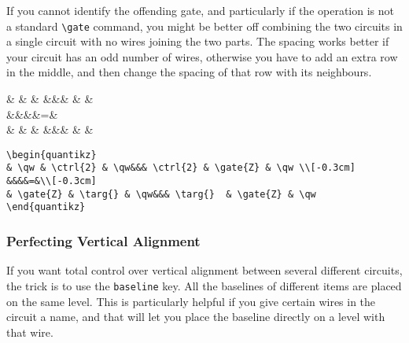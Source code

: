 \documentclass[aps,pra,10pt,nofootinbib]{revtex4}
\begin{document}
If you cannot identify the offending gate, and particularly if the operation is not a standard \verb!\gate! command, you might be better off combining the two circuits in a single circuit with no wires joining the two parts. The spacing works better if your circuit has an odd number of wires, otherwise you have to add an extra row in the middle, and then change the spacing of that row with its neighbours.
\begin{Code}
\begin{center}
\begin{quantikz}
& \qw &  & \qw&&&  &  & \qw \\[-0.3cm]
&&&&=&\\[-0.3cm]
&  & \targ{} & \qw&&& \targ{}  &  & \qw
\end{quantikz}
\end{center}
\tcblower
\begin{lstlisting}
\begin{quantikz}
& \qw & \ctrl{2} & \qw&&& \ctrl{2} & \gate{Z} & \qw \\[-0.3cm]
&&&&=&\\[-0.3cm]
& \gate{Z} & \targ{} & \qw&&& \targ{}  & \gate{Z} & \qw
\end{quantikz}
\end{lstlisting}
\end{Code}

\subsubsection{Perfecting Vertical Alignment}

If you want total control over vertical alignment between several different circuits, the trick is to use the \verb!baseline! key. All the baselines of different items are placed on the same level. This is particularly helpful if you give certain wires in the circuit a name, and that will let you place the baseline directly on a level with that wire.
\end{document}
